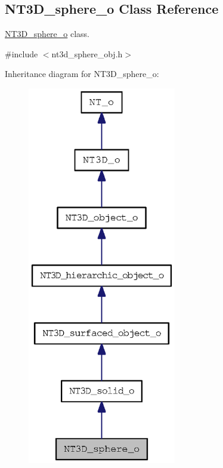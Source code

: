 \subsection{NT3D\_\-sphere\_\-o Class Reference}
\label{class_n_t3_d__sphere__o}


\hyperlink{class_n_t3_d__sphere__o}{NT3D\_\-sphere\_\-o} class.  




{\ttfamily \#include $<$nt3d\_\-sphere\_\-obj.h$>$}



Inheritance diagram for NT3D\_\-sphere\_\-o:
\nopagebreak
\begin{figure}[H]
\begin{center}
\leavevmode
\includegraphics[width=184pt]{class_n_t3_d__sphere__o__inherit__graph}
\end{center}
\end{figure}


